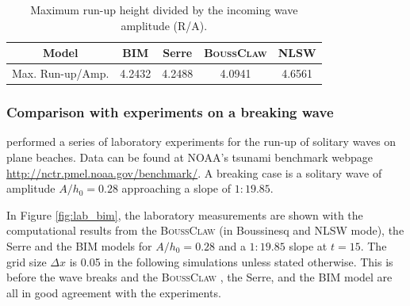 \documentclass[review]{elsarticle}
\newcommand{\BoussClaw}{\textsc{BoussClaw} }
\begin{document}
\begin{table}[!htb]
	\begin{tabular}{c|cccc} \hline
		Model & BIM & Serre & \BoussClaw & NLSW \\ \hline
		Max. Run-up/Amp. & 4.2432 & 4.2488 & 4.0941 & 4.6561 \\
		\hline
	\end{tabular}
	\caption{Maximum run-up height divided by the incoming wave amplitude (R/A).}
    \label{tab:runup_slope10}
\end{table}

 
\subsubsection{Comparison with experiments on a breaking wave}
\label{sec:wave_break}


\citet{synolakis1987runup} performed a series of laboratory experiments for the run-up of solitary waves
on plane beaches. 
Data can be found at  
NOAA's tsunami benchmark webpage \url{http://nctr.pmel.noaa.gov/benchmark/}.
A  breaking case is a solitary wave of amplitude $A/h_0=0.28$ 
approaching a slope of $1:19.85$. 


In Figure \ref{fig:lab_bim}, the laboratory measurements
are shown with the computational results from the \BoussClaw (in Boussinesq and  NLSW mode),  the Serre and the BIM models
for $A/h_0=0.28$ and a $1:19.85$ slope at $t=15$. 
The grid size $\Delta x$ is 0.05 in the following simulations
unless stated otherwise.
This is before the wave breaks and
the \BoussClaw, the Serre, and the  BIM model are all in good agreement with the experiments.
\end{document}
